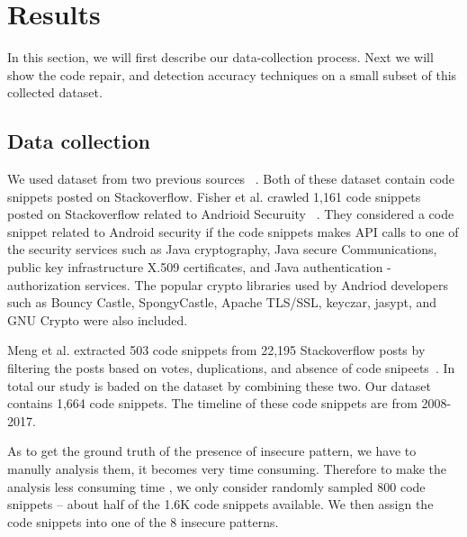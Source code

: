 \section{Results}
\label{sec:results}
In this section, we will first describe our data-collection process. Next we will show the code repair, and detection accuracy techniques on a small subset of this collected dataset.   

\subsection{Data collection} 
  We used dataset from two previous sources ~\cite{meng2018secure,fischer2017stack}. Both of these dataset contain code snippets posted on Stackoverflow. 
  Fisher et al. crawled 1,161 code snippets posted on Stackoverflow related to Andrioid Securuity ~\cite{fischer2017stack}. They considered a code snippet related to Android security if the code snippets makes API calls to
  one of the security services such as Java cryptography, Java secure Communications, public key infrastructure X.509 certificates, and Java authentication - authorization services. The popular crypto libraries used by Andriod developers such as Bouncy Castle, SpongyCastle, Apache TLS/SSL, keyczar, jasypt, and GNU Crypto were also included. 
  
  Meng et al.  extracted 503 code snippets from 22,195 Stackoverflow posts by filtering the posts based on votes, duplications, and absence of code snipeets~\cite{meng2018secure}. In total our study is baded on the dataset by combining these two. Our dataset contains 1,664 code snippets. The timeline of these code snippets are from 2008-2017.

  As to get the ground truth of the presence of insecure pattern, we have to manully analysis them, it becomes very time consuming. Therefore to make the analysis less consuming time , we only consider randomly sampled 800 code snippets -- about half of the 1.6K code snippets available. 
  We then assign the code snippets into one of the 8 insecure patterns.  %
  

